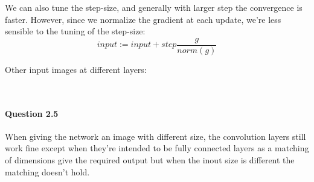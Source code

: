 \documentclass[10pt]{article}
\begin{document}
	We can also tune the step-size, and generally with larger step the convergence is faster. However, since we normalize the gradient at each update, we're less sensible to the tuning of the step-size:
	\[input:=input+step\frac{g}{norm(g)}\]
	\begin{figure}[H]
	    \centering
	    \vspace{15pt}
	    \caption{}
	\end{figure} 
	Other input images at different layers:
	\begin{figure}[H]
    	\centering

    	\\
    \caption{}
	\end{figure}
	\paragraph{Question 2.5}
	When giving the network an image with different size, the convolution layers still work fine except when they're intended to be fully connected layers as a matching of dimensions give the required output but when the inout size is different the matching doesn't hold.
\end{document}
